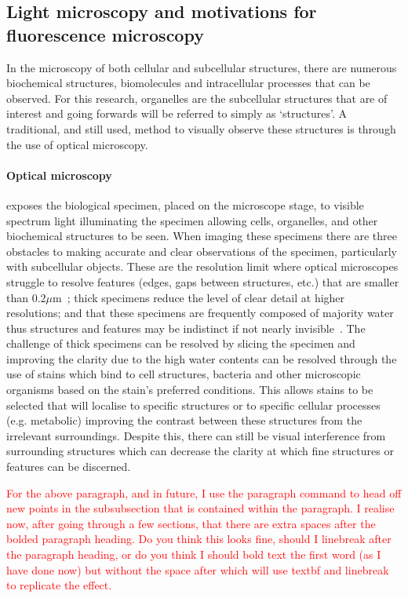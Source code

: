 \subsection{Light microscopy and motivations for fluorescence microscopy}\label{sec:lightVsFluoro}
In the microscopy of both cellular and subcellular structures, there are numerous biochemical structures, biomolecules and intracellular processes that can be observed. For this research, organelles are the subcellular structures that are of interest and going forwards will be referred to simply as `structures'. A traditional, and still used, method to visually observe these structures is through the use of optical microscopy. 
\paragraph{Optical microscopy} exposes the biological specimen, placed on the microscope stage, to visible spectrum light illuminating the specimen allowing cells, organelles, and other biochemical structures to be seen. When imaging these specimens there are three obstacles to making accurate and clear observations of the specimen, particularly with subcellular objects. These are the resolution limit where optical microscopes struggle to resolve features (edges, gaps between structures, etc.) that are smaller than $0.2\mu$m~\cite[p.582]{GeneralMicroscop}; thick specimens reduce the level of clear detail at higher resolutions; and that these specimens are frequently composed of majority water thus structures and features may be indistinct if not nearly invisible~\cite[p.585]{GeneralMicroscop}. The challenge of thick specimens can be resolved by slicing the specimen and improving the clarity due to the high water contents can be resolved through the use of stains which bind to cell structures, bacteria and other microscopic organisms based on the stain's preferred conditions. This allows stains to be selected that will localise to specific structures or to specific cellular processes (e.g. metabolic) improving the contrast between these structures from the irrelevant surroundings. Despite this, there can still be visual interference from surrounding structures which can decrease the clarity at which fine structures or features can be discerned.\par 
\textcolor{red}{For the above paragraph, and in future, I use the paragraph{} command to head off new points in the subsubsection that is contained within the paragraph. I realise now, after going through a few sections, that there are extra spaces after the bolded paragraph heading. Do you think this looks fine, should I linebreak after the paragraph heading, or do you think I should bold text the first word (as I have done now) but without the space after which will use textbf and linebreak to replicate the effect.}

